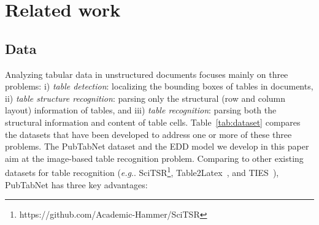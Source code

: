 \documentclass[conference]{IEEEtran}
\makeatletter
\DeclareRobustCommand\onedot{\futurelet\@let@token\@onedot}
\def\@onedot{\ifx\@let@token.\else.\null\fi\xspace}
\def\eg{\emph{e.g}\onedot} \def\Eg{\emph{E.g}\onedot}
\makeatother
\begin{document}
\section{Related work}
\label{sec: bkg}

\subsection{Data}

Analyzing tabular data in unstructured documents
focuses mainly on three problems: i) \emph{table detection}: localizing the
bounding boxes of tables in documents, ii) \emph{table structure recognition}:
parsing only the structural (row and column layout) information of tables, and
iii) \emph{table recognition}: parsing both the structural information and
content of table cells. Table~\ref{tab:dataset} compares the datasets that have
been developed to address one or more of these three problems. The PubTabNet
dataset and the EDD model we develop in this paper aim at the image-based table
recognition problem. Comparing to other existing datasets for table recognition
(\eg
SciTSR\footnote{\label{fn:SciTSR}https://github.com/Academic-Hammer/SciTSR},
Table2Latex~\cite{deng2019challenges}, and TIES~\cite{qasim2019rethinking}),
PubTabNet has three key advantages:
\end{document}
